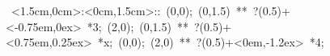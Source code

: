 \hbox{
\xy    <1.5cm,0cm>:<0cm,1.5cm>::
       (0,0); (0,1.5) **\dir{-}  ?(0.5)+<-0.75em,0ex> *{3};
       (2,0); (0,1.5) **\dir{-}  ?(0.5)+<0.75em,0.25ex> *{x};
       (0,0); (2,0) **\dir{-}    ?(0.5)+<0em,-1.2ex> *{4};
       \endxy}
